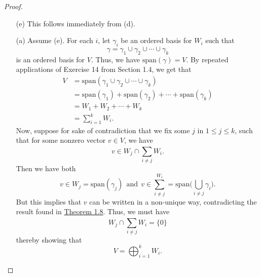 \begin{proof}
\begin{enumerate}
        (b) and (c) implies that \( {w}_{i} = 0  \) for all \( i  \). Thus,  
        \[  0 = {w}_{i} = \sum_{ j=1 }^{ {m}_{i} } {a}_{ij} {v}_{ij} \]
        for each \( i  \). Since each \( {\gamma}_{i} \) is linearly independent, we must have each \( {a}_{ij} = 0  \) for all \( i  \) and \( j  \). Thus, \( \gamma \) is linearly independent and therefore is a basis for \( V  \).
    \item[(e)] This follows immediately from (d).
    \item[(a)] Assume (e). For each \( i \), let \( {\gamma}_{i} \) be an ordered basis for \( {W}_{i} \) such that    
        \[  \gamma = {\gamma}_{1} \cup {\gamma}_{2} \cup \cdots \cup {\gamma}_{k} \]
        is an ordered basis for \( V  \). Thus, we have \( \text{span}(\gamma) = V  \). By repeated applications of Exercise 14 from Section 1.4, we get that
        \begin{align*}
            V &= \text{span}({\gamma}_{1} \cup {\gamma}_{2} \cup \cdots \cup {\gamma}_{k}) \\
              &= \text{span}({\gamma}_{1}) + \text{span}({\gamma}_{2}) + \cdots + \text{span}({\gamma}_{k}) \\
              &=  {W}_{1} + {W}_{2} + \cdots + {W}_{k}  \\
              &= \sum_{ i=1 }^{ k  }{W}_{i}.
        \end{align*}
        Now, suppose for sake of contradiction that we fix some \( j  \) in \( 1 \leq j \leq k  \), such that for some nonzero vector \( v \in V  \), we have
        \[  v \in {W}_{j} \cap \sum_{ i \neq j  }^{  } {W}_{i}. \]
        Then we have both
        \[  v \in {W}_{j} = \text{span}({\gamma}_{j}) \ \ \text{and} \ \ v \in \sum_{ i \neq j  }^{ {W}_{i} } = \text{span}\Big( \bigcup_{ i \neq j  }^{  }  {\gamma}_{i} \Big). \]
        But this implies that \( v  \) can be written in a non-unique way, contradicting the result found in {\hyperref[Unique combinations from bases]{Theorem 1.8}}. Thus, we must have  
        \[  {W}_{j} \cap \sum_{ i \neq j  }^{  }{W}_{i} = \{ 0  \} \]
        thereby showing that 
        \[ V = {\bigoplus}_{i=1}^{k} {W}_{i}.  \]
\end{enumerate}
\end{proof}

